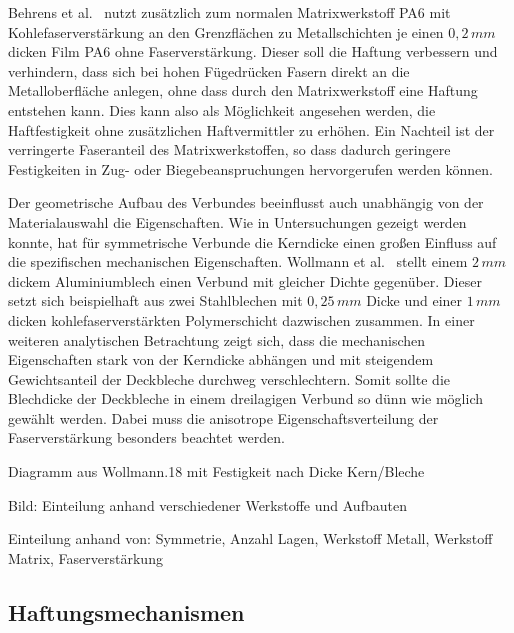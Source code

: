 Behrens et al.~\cite{Behrens2019} nutzt zusätzlich zum normalen Matrixwerkstoff PA6 mit Kohlefaserverstärkung an den Grenzflächen zu Metallschichten je einen $0,2 \, mm$ dicken Film PA6 ohne Faserverstärkung.
Dieser soll die Haftung verbessern und verhindern, dass sich bei hohen Fügedrücken Fasern direkt an die Metalloberfläche anlegen, ohne dass durch den Matrixwerkstoff eine Haftung entstehen kann.
Dies kann also als Möglichkeit angesehen werden, die Haftfestigkeit ohne zusätzlichen Haftvermittler zu erhöhen.
Ein Nachteil ist der verringerte Faseranteil des Matrixwerkstoffen, so dass dadurch geringere Festigkeiten in Zug- oder Biegebeanspruchungen hervorgerufen werden können.


Der geometrische Aufbau des Verbundes beeinflusst auch unabhängig von der Materialauswahl die Eigenschaften.
Wie in Untersuchungen gezeigt werden konnte, hat für symmetrische Verbunde die Kerndicke einen großen Einfluss auf die spezifischen mechanischen Eigenschaften.
Wollmann et al.~\cite{Wollmann2018} stellt einem $2\,mm$ dickem Aluminiumblech einen Verbund mit gleicher Dichte gegenüber.
Dieser setzt sich beispielhaft aus zwei Stahlblechen mit $0,25\,mm$ Dicke und einer $1\,mm$ dicken kohlefaserverstärkten Polymerschicht dazwischen zusammen.
In einer weiteren analytischen Betrachtung zeigt sich, dass die mechanischen Eigenschaften stark von der Kerndicke abhängen und mit steigendem Gewichtsanteil der Deckbleche durchweg verschlechtern.
Somit sollte die Blechdicke der Deckbleche in einem dreilagigen Verbund so dünn wie möglich gewählt werden.
Dabei muss die anisotrope Eigenschaftsverteilung der Faserverstärkung besonders beachtet werden.

Diagramm aus Wollmann.18 mit Festigkeit nach Dicke Kern/Bleche


Bild: Einteilung anhand verschiedener Werkstoffe und Aufbauten


Einteilung anhand von: Symmetrie, Anzahl Lagen, Werkstoff Metall, Werkstoff Matrix, Faserverstärkung

\subsection{Haftungsmechanismen}\label{subsec:haftung}


